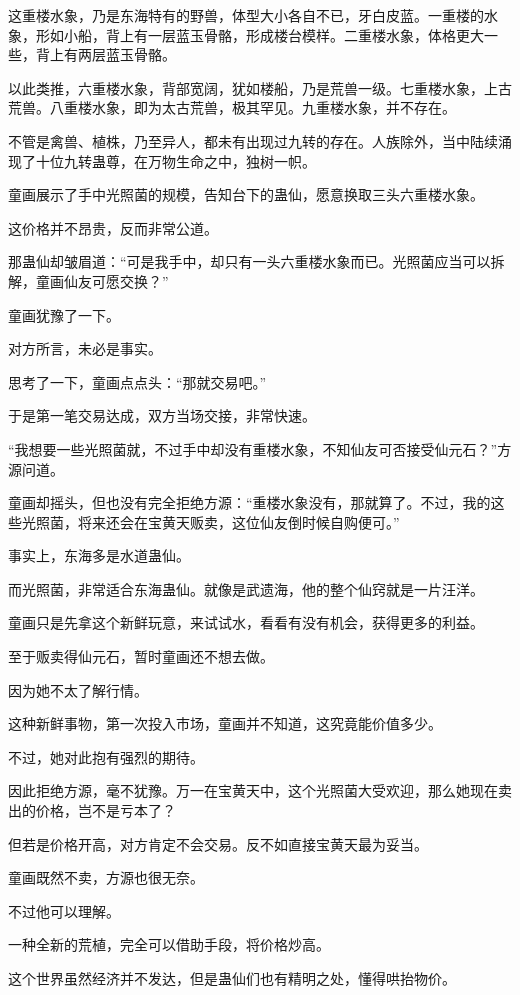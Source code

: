\begin{this_body}
这重楼水象，乃是东海特有的野兽，体型大小各自不已，牙白皮蓝。一重楼的水象，形如小船，背上有一层蓝玉骨骼，形成楼台模样。二重楼水象，体格更大一些，背上有两层蓝玉骨骼。

以此类推，六重楼水象，背部宽阔，犹如楼船，乃是荒兽一级。七重楼水象，上古荒兽。八重楼水象，即为太古荒兽，极其罕见。九重楼水象，并不存在。

不管是禽兽、植株，乃至异人，都未有出现过九转的存在。人族除外，当中陆续涌现了十位九转蛊尊，在万物生命之中，独树一帜。

童画展示了手中光照菌的规模，告知台下的蛊仙，愿意换取三头六重楼水象。

这价格并不昂贵，反而非常公道。

那蛊仙却皱眉道：“可是我手中，却只有一头六重楼水象而已。光照菌应当可以拆解，童画仙友可愿交换？”

童画犹豫了一下。

对方所言，未必是事实。

思考了一下，童画点点头：“那就交易吧。”

于是第一笔交易达成，双方当场交接，非常快速。

“我想要一些光照菌就，不过手中却没有重楼水象，不知仙友可否接受仙元石？”方源问道。

童画却摇头，但也没有完全拒绝方源：“重楼水象没有，那就算了。不过，我的这些光照菌，将来还会在宝黄天贩卖，这位仙友倒时候自购便可。”

事实上，东海多是水道蛊仙。

而光照菌，非常适合东海蛊仙。就像是武遗海，他的整个仙窍就是一片汪洋。

童画只是先拿这个新鲜玩意，来试试水，看看有没有机会，获得更多的利益。

至于贩卖得仙元石，暂时童画还不想去做。

因为她不太了解行情。

这种新鲜事物，第一次投入市场，童画并不知道，这究竟能价值多少。

不过，她对此抱有强烈的期待。

因此拒绝方源，毫不犹豫。万一在宝黄天中，这个光照菌大受欢迎，那么她现在卖出的价格，岂不是亏本了？

但若是价格开高，对方肯定不会交易。反不如直接宝黄天最为妥当。

童画既然不卖，方源也很无奈。

不过他可以理解。

一种全新的荒植，完全可以借助手段，将价格炒高。

这个世界虽然经济并不发达，但是蛊仙们也有精明之处，懂得哄抬物价。


\end{this_body}
